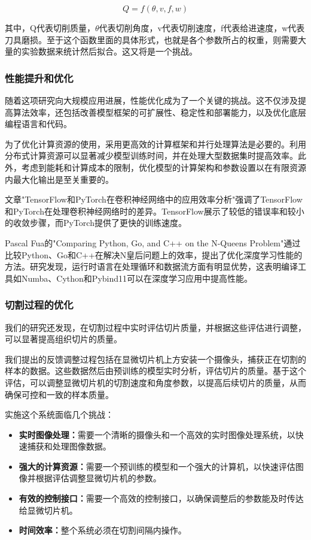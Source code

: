 \begin{equation}
    Q = f(\theta, v, f, w)
\end{equation}

其中，Q代表切削质量，$\theta$代表切削角度，v代表切削速度，f代表给进速度，w代表刀具磨损。至于这个函数里面的具体形式，也就是各个参数所占的权重，则需要大量的实验数据来统计然后拟合。这又将是一个挑战。


\subsubsection{性能提升和优化}

随着这项研究向大规模应用进展，性能优化成为了一个关键的挑战。这不仅涉及提高算法效率，还包括改善模型框架的可扩展性、稳定性和部署能力，以及优化底层编程语言和代码。

为了优化计算资源的使用，采用更高效的计算框架和并行处理算法是必要的。利用分布式计算资源可以显著减少模型训练时间，并在处理大型数据集时提高效率。此外，考虑到能耗和计算成本的限制，优化模型的计算架构和参数设置以在有限资源内最大化输出是至关重要的。

文章"TensorFlow和PyTorch在卷积神经网络中的应用效率分析"强调了TensorFlow和PyTorch在处理卷积神经网络时的差异\cite{6.2}。TensorFlow展示了较低的错误率和较小的收敛步骤，而PyTorch提供了更快的训练速度。

Pascal Fua的"Comparing Python, Go, and C++ on the N-Queens Problem"通过比较Python、Go和C++在解决N皇后问题上的效率，提出了优化深度学习性能的方法。\cite{6.3}研究发现，运行时语言在处理循环和数据流方面有明显优势，这表明编译工具如Numba、Cython和Pybind11可以在深度学习应用中提高性能。

\subsubsection{切割过程的优化}

我们的研究还发现，在切割过程中实时评估切片质量，并根据这些评估进行调整，可以显著提高组织切片的质量。

我们提出的反馈调整过程包括在显微切片机上方安装一个摄像头，捕获正在切割的样本的数据。这些数据然后由预训练的模型实时分析，评估切片的质量。基于这个评估，可以调整显微切片机的切割速度和角度参数，以提高后续切片的质量，从而确保可控和一致的样本质量。

实施这个系统面临几个挑战：

\begin{itemize} \item \textbf{实时图像处理：}需要一个清晰的摄像头和一个高效的实时图像处理系统，以快速捕获和处理图像数据。 \item \textbf{强大的计算资源：}需要一个预训练的模型和一个强大的计算机，以快速评估图像并根据评估调整显微切片机的参数。 \item \textbf{有效的控制接口：}需要一个高效的控制接口，以确保调整后的参数能及时传达给显微切片机。 \item \textbf{时间效率：}整个系统必须在切割间隔内操作。 \end{itemize}

